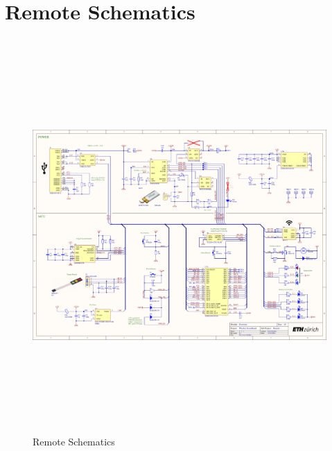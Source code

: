 \section{Remote Schematics}
\label{sec:Schematics}
\begin{figure}[H]
	\centering
	\includegraphics[height=15cm, angle=-90, page=1]{../../5_Hardware/WSBR_Board/Project Outputs for WSBR_Board/WSBR_Board.PDF}
	\caption{Remote Schematics}
	\label{fig:Remote Schematics}
\end{figure}
\newpage


